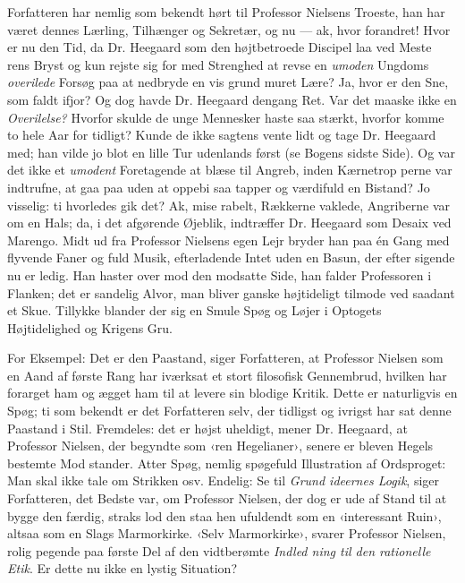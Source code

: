 \documentclass[12pt,a4paper,openany]{book}
\newcommand{\opage}[1]{\marginnote{\footnotesize\textit{[#1]}}}
\begin{document}
Forfatteren har nemlig som bekendt hørt til Professor
Nielsens Troeste, han har været dennes Lærling, Tilhænger og
Sekretær, og nu --- ak, hvor forandret! Hvor er nu den Tid,
da Dr. Heegaard som den højtbetroede Discipel laa ved Meste\-%
rens Bryst og kun rejste sig for med Strenghed at revse en
\emph{umoden} Ungdoms \emph{overilede} Forsøg paa at nedbryde en vis grund\-%
muret Lære? Ja, hvor er den Sne, som faldt ifjor? Og dog
havde Dr. Heegaard dengang Ret. Var det maaske ikke en
\emph{Overilelse?} Hvorfor skulde de unge Mennesker haste saa stærkt,
hvorfor komme to hele Aar for tidligt? Kunde de ikke sagtens
vente lidt og tage Dr. Heegaard med; han vilde jo blot en lille
Tur udenlands først (se Bogens sidste Side). Og var det ikke
\opage{107}et \emph{umodent} Foretagende at blæse til Angreb, inden Kærnetrop\-%
perne var indtrufne, at gaa paa uden at oppebi saa tapper og
værdifuld en Bistand? Jo visselig: ti hvorledes gik det? Ak, mise\-%
rabelt, Rækkerne vaklede, Angriberne var om en Hals; da, i det
afgørende Øjeblik, indtræffer Dr. Heegaard som Desaix ved
Marengo. Midt ud fra Professor Nielsens egen Lejr bryder han
paa én Gang med flyvende Faner og fuld Musik, efterladende
Intet uden en Basun, der efter sigende nu er ledig. Han haster
over mod den modsatte Side, han falder Professoren i Flanken;
det er sandelig Alvor, man bliver ganske højtideligt tilmode ved
saadant et Skue. Tillykke blander der sig en Smule Spøg og
Løjer i Optogets Højtidelighed og Krigens Gru.

For Eksempel: Det er den Paastand, siger Forfatteren, at
Professor Nielsen som en Aand af første Rang har iværksat et
stort filosofisk Gennembrud, hvilken har forarget ham og ægget
ham til at levere sin blodige Kritik. Dette er naturligvis en
Spøg; ti som bekendt er det Forfatteren selv, der tidligst og
ivrigst har sat denne Paastand i Stil. Fremdeles: det er højst
uheldigt, mener Dr. Heegaard, at Professor Nielsen, der begyndte
som ‹ren Hegelianer›, senere er bleven Hegels bestemte Mod\-%
stander. Atter Spøg, nemlig spøgefuld Illustration af Ordsproget:
Man skal ikke tale om Strikken osv. Endelig: Se til \emph{Grund\-%
ideernes Logik}, siger Forfatteren, det Bedste var, om Professor
Nielsen, der dog er ude af Stand til at bygge den færdig, straks
lod den staa hen ufuldendt som en ‹interessant Ruin›, altsaa som
en Slags Marmorkirke. ‹Selv Marmorkirke›, svarer Professor
Nielsen, rolig pegende paa første Del af den vidtberømte \emph{Indled\-%
ning til den rationelle Etik}. Er dette nu ikke en lystig Situation?
\end{document}
